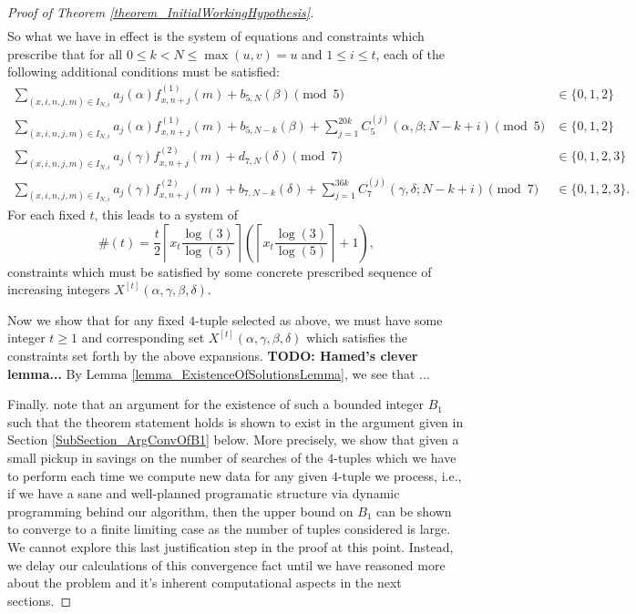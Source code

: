 \documentclass[12pt]{article}
\begin{document}
\begin{proof}[Proof of Theorem \ref{theorem_InitialWorkingHypothesis}]
\begin{align*}
\end{align*} 
So what we have in effect is the system of equations and constraints which prescribe that 
for all $0 \leq k < N \leq \max(u,v) = u$ and $1 \leq i \leq t$, 
each of the following additional conditions must be satisfied: 
\begin{align*} 
\tag{i} 
\sum_{(x,i,n,j,m) \in I_{N,i}} a_j(\alpha) f_{x,n+j}^{(1)}(m) + b_{5,N}(\beta) \pmod{5} & \in \{0,1,2\} \\ 
\tag{ii} 
\sum_{(x,i,n,j,m) \in I_{N,i}} a_j(\alpha) f_{x,n+j}^{(1)}(m) + b_{5,N-k}(\beta) + \sum_{j=1}^{20k} 
     C_5^{(j)}(\alpha,\beta;N-k+i) \pmod{5} & \in \{0,1,2\} \\ 
\tag{iii} 
\sum_{(x,i,n,j,m) \in I_{N,i}} a_j(\gamma) f_{x,n+j}^{(2)}(m) + d_{7,N}(\delta) \pmod{7} & \in \{0,1,2,3\} \\ 
\tag{iv} 
\sum_{(x,i,n,j,m) \in I_{N,i}} a_j(\gamma) f_{x,n+j}^{(2)}(m) + b_{7,N-k}(\delta) + \sum_{j=1}^{36k} 
     C_7^{(j)}(\gamma,\delta;N-k+i) \pmod{7} & \in \{0,1,2,3\}. 
\end{align*} 
For each fixed $t$, this leads to a system of 
$$\#(t) = \frac{t}{2}\left\lceil x_t \frac{\log(3)}{\log(5)} \right\rceil \left( 
     \left\lceil x_t \frac{\log(3)}{\log(5)} \right\rceil + 1\right),$$ 
constraints which must be satisfied by some concrete prescribed sequence of increasing integers 
$X^{[t]}(\alpha,\gamma,\beta,\delta)$. 

Now we show that for any fixed $4$-tuple selected as above, we must have some integer $t \geq 1$ and 
corresponding set $X^{[t]}(\alpha,\gamma,\beta,\delta)$ which satisfies the constraints set forth by the 
above expansions. \textbf{TODO: Hamed's clever lemma...} By 
Lemma \ref{lemma_ExistenceOfSolutionsLemma}, we see that ... 

Finally. note that an argument for the existence of such a bounded integer $B_1$ such that the theorem 
statement holds is shown to exist in the argument given in 
Section \ref{SubSection_ArgConvOfB1} below. More precisely, we show that given a small pickup in savings on the 
number of searches of the $4$-tuples which we have to perform each time we compute new data for any given 
$4$-tuple we process, i.e., if we have a sane and well-planned programatic structure via dynamic 
programming behind our algorithm, then the upper bound on $B_1$ can be shown to converge to a finite 
limiting case as the number of tuples considered is large. We cannot explore this last justification step 
in the proof at this point. Instead, we delay our calculations of this convergence fact until we have 
reasoned more about the problem and it's inherent computational aspects in the next sections. 
\end{proof} 
\end{document}
